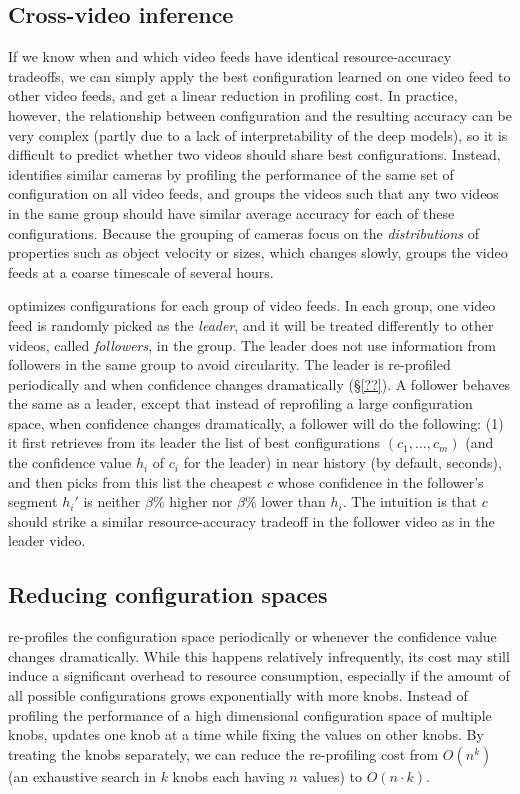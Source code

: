 \subsection{Cross-video inference}
If we know when and which video feeds have identical 
resource-accuracy tradeoffs, we can simply apply the best 
configuration learned on one video feed to other video feeds, 
and get a linear reduction in profiling cost. 
In practice, however, the relationship between configuration 
and the resulting accuracy can be very complex (partly due to 
a lack of interpretability of the deep \nn models), so it is
difficult to predict whether two videos should share best
configurations.
Instead, \name identifies similar cameras by profiling the
performance of the same set of configuration on all video 
feeds, and groups the videos such that any two videos in the
same group should have similar average accuracy for each of
these configurations.
Because the grouping of cameras focus on the {\em distributions}
of properties such as object velocity or sizes, which changes
slowly, \name groups the video feeds at a coarse timescale of 
several hours.

\name optimizes configurations for each group of video feeds.
In each group, one video feed is randomly picked as the {\em 
leader}, and it will be treated differently to other 
videos, called {\em followers}, in the group. 
The leader does not use information from followers in the same
group to avoid circularity.
The leader is re-profiled periodically and when confidence 
changes dramatically (\S\ref{??}).
A follower behaves the same as a leader, except that instead of
reprofiling a large configuration space, when confidence 
changes dramatically, a follower will do the following:
(1) it first retrieves from its leader 
the list of best configurations $(c_1,\dots,c_m)$ (and the 
confidence value $h_i$ of $c_i$ for the leader) in near history
(by default, \fillme seconds), and then picks from this list 
the cheapest $c$ whose confidence in the follower's segment 
$h_i'$ is neither $\beta\%$ higher nor $\beta\%$ lower than 
$h_i$.
The intuition is that $c$ should strike a similar 
resource-accuracy tradeoff in the follower video as in the 
leader video.



\subsection{Reducing configuration spaces}
\name re-profiles the configuration space periodically or
whenever the confidence value changes dramatically.
While this happens relatively infrequently, its cost may
still induce a significant overhead to resource consumption,
especially if the amount of all possible configurations grows
exponentially with more knobs.
Instead of profiling the performance of a high 
dimensional configuration space of multiple knobs, \name
updates one knob at a time while fixing the values on other
knobs.
By treating the knobs separately, we can reduce the 
re-profiling cost from $O(n^k)$ (an exhaustive search in $k$
knobs each having $n$ values) to $O(n\cdot k)$.

